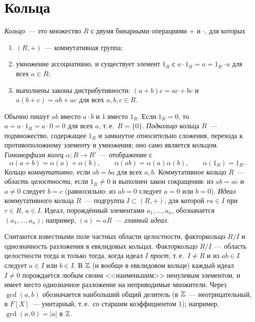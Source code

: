 \section{Кольца}

\begin{definition}
\emph{Кольцо}~--- это множество $R$ с двумя бинарными операциями $+$ и $\cdot$, для которых
\begin{enumerate}[label=(\alph*)]
\item $(R,+)$~--- коммутативная группа;
\item умножение ассоциативно, и существует элемент $1_R$ с $a\cdot1_R=a=1_R\cdot a$ для всех $a\in R$;
\item выполнены законы дистрибутивности: $(a+b)c=ac+bc$ и $a(b+c)=ab+ac$ для всех $a,b,c\in R$.
\end{enumerate}
\end{definition}

Обычно пишут $ab$ вместо $a\cdot b$ и $1$ вместо $1_R$. Если $1_R=0$, то $a=a\cdot1_R=a\cdot0=0$ для всех $a$, т.\,е.\
$R=\{0\}$. \emph{Подкольцо} кольца $R$~--- подмножество, содержащее $1_R$ и замкнутое относительно сложения, перехода к
противоположному элементу и умножения; оно само является кольцом. \emph{Гомоморфизм колец} $\alpha\colon R\to R'$~---
отображение с
\[
\alpha(a+b)=\alpha(a)+\alpha(b),\qquad \alpha(ab)=\alpha(a)\alpha(b),\qquad \alpha(1_R)=1_{R'}.
\]
Кольцо \emph{коммутативно}, если $ab=ba$ для всех $a,b$. Коммутативное кольцо $R$~--- \emph{область целостности}, если
$1_R\ne0$ и выполнен закон сокращения: из $ab=ac$ и $a\ne0$ следует $b=c$ (равносильно: из $ab=0$ следует $a=0$ или
$b=0$). \emph{Идеал} коммутативного кольца $R$~--- подгруппа $I\subset(R,+)$, для которой $ra\in I$ при $r\in R$, $a\in I$.
Идеал, порождённый элементами $a_1,\dots,a_n$, обозначается $(a_1,\dots,a_n)$; например, $(a)=aR$~---
\emph{главный идеал}.

Считаются известными поле частных области целостности, факторкольцо $R/I$ и однозначность разложения в евклидовых
кольцах. Факторкольцо $R/I$~--- область целостности
тогда и только тогда, когда идеал $I$ \emph{прост}, т.\,е.\ $I\ne R$ и из $ab\in I$ следует $a\in I$ или $b\in I$. В $\mathbb Z$
(и вообще в евклидовом кольце) каждый идеал $I\ne0$ порождается любым своим <<наименьшим>> ненулевым элементом, и
имеет место однозначное разложение на неприводимые множители. Через $\gcd(a,b)$ обозначается наибольший общий
делитель (в $\mathbb Z$~--- неотрицательный, в $F[X]$~--- унитарный, т.\,е.\ со старшим коэффициентом $1$); например,
$\gcd(a,0)=|a|$ в $\mathbb Z$.


